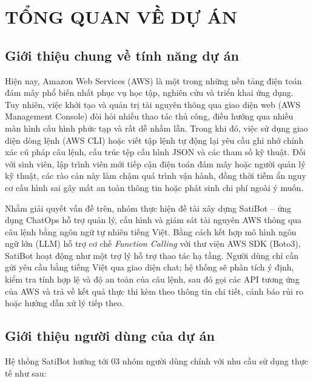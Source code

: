 \documentclass[a4paper,12pt]{article}
\begin{document}
\tableofcontents
\clearpage
{}


\section{TỔNG QUAN VỀ DỰ ÁN}

\subsection{Giới thiệu chung về tính năng dự án}

Hiện nay, Amazon Web Services (AWS) là một trong những nền tảng điện toán đám mây phổ biến nhất phục vụ học tập, nghiên cứu và triển khai ứng dụng. Tuy nhiên, việc khởi tạo và quản trị tài nguyên thông qua giao diện web (AWS Management Console) đòi hỏi nhiều thao tác thủ công, điều hướng qua nhiều màn hình cấu hình phức tạp và rất dễ nhầm lẫn. Trong khi đó, việc sử dụng giao diện dòng lệnh (AWS CLI) hoặc viết tập lệnh tự động lại yêu cầu ghi nhớ chính xác cú pháp câu lệnh, cấu trúc tệp cấu hình JSON và các tham số kỹ thuật. Đối với sinh viên, lập trình viên mới tiếp cận điện toán đám mây hoặc người quản lý kỹ thuật, các rào cản này làm chậm quá trình vận hành, đồng thời tiềm ẩn nguy cơ cấu hình sai gây mất an toàn thông tin hoặc phát sinh chi phí ngoài ý muốn.

Nhằm giải quyết vấn đề trên, nhóm thực hiện đề tài xây dựng SatiBot -- ứng dụng ChatOps hỗ trợ quản lý, cấu hình và giám sát tài nguyên AWS thông qua câu lệnh bằng ngôn ngữ tự nhiên tiếng Việt. Bằng cách kết hợp mô hình ngôn ngữ lớn (LLM) hỗ trợ cơ chế \textit{Function Calling} với thư viện AWS SDK (Boto3), SatiBot hoạt động như một trợ lý hỗ trợ thao tác hạ tầng. Người dùng chỉ cần gửi yêu cầu bằng tiếng Việt qua giao diện chat; hệ thống sẽ phân tích ý định, kiểm tra tính hợp lệ và độ an toàn của câu lệnh, sau đó gọi các API tương ứng của AWS và trả về kết quả thực thi kèm theo thông tin chi tiết, cảnh báo rủi ro hoặc hướng dẫn xử lý tiếp theo.

\subsection{Giới thiệu người dùng của dự án}

Hệ thống SatiBot hướng tới 03 nhóm người dùng chính với nhu cầu sử dụng thực tế như sau:
\end{document}
